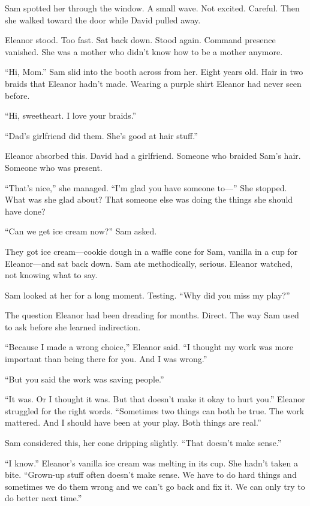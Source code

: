 Sam spotted her through the window. A small wave. Not excited. Careful. Then she walked toward the door while David pulled away.

Eleanor stood. Too fast. Sat back down. Stood again. Command presence vanished. She was a mother who didn't know how to be a mother anymore.

``Hi, Mom.'' Sam slid into the booth across from her. Eight years old. Hair in two braids that Eleanor hadn't made. Wearing a purple shirt Eleanor had never seen before.

``Hi, sweetheart. I love your braids.''

``Dad's girlfriend did them. She's good at hair stuff.''

Eleanor absorbed this. David had a girlfriend. Someone who braided Sam's hair. Someone who was present.

``That's nice,'' she managed. ``I'm glad you have someone to---'' She stopped. What was she glad about? That someone else was doing the things she should have done?

``Can we get ice cream now?'' Sam asked.

They got ice cream---cookie dough in a waffle cone for Sam, vanilla in a cup for Eleanor---and sat back down. Sam ate methodically, serious. Eleanor watched, not knowing what to say.

Sam looked at her for a long moment. Testing. ``Why did you miss my play?''

The question Eleanor had been dreading for months. Direct. The way Sam used to ask before she learned indirection.

``Because I made a wrong choice,'' Eleanor said. ``I thought my work was more important than being there for you. And I was wrong.''

``But you said the work was saving people.''

``It was. Or I thought it was. But that doesn't make it okay to hurt you.'' Eleanor struggled for the right words. ``Sometimes two things can both be true. The work mattered. And I should have been at your play. Both things are real.''

Sam considered this, her cone dripping slightly. ``That doesn't make sense.''

``I know.'' Eleanor's vanilla ice cream was melting in its cup. She hadn't taken a bite. ``Grown-up stuff often doesn't make sense. We have to do hard things and sometimes we do them wrong and we can't go back and fix it. We can only try to do better next time.''

